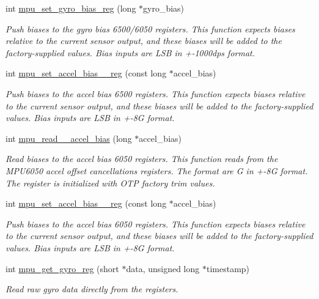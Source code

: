 \begin{DoxyCompactItemize}
int \hyperlink{group___d_r_i_v_e_r_s_ga01361a0f5c1f048cb0742bd3d0e4d3a5}{mpu\+\_\+set\+\_\+gyro\+\_\+bias\+\_\+reg} (long $\ast$gyro\+\_\+bias)
\begin{DoxyCompactList}\small\item\em Push biases to the gyro bias 6500/6050 registers. This function expects biases relative to the current sensor output, and these biases will be added to the factory-\/supplied values. Bias inputs are L\+SB in +-\/1000dps format. \end{DoxyCompactList}\item 
int \hyperlink{group___d_r_i_v_e_r_s_gaa7265afee29b8307ff49a8b1ccd9238a}{mpu\+\_\+set\+\_\+accel\+\_\+bias\+\_\+\_\+reg} (const long $\ast$accel\+\_\+bias)
\begin{DoxyCompactList}\small\item\em Push biases to the accel bias 6500 registers. This function expects biases relative to the current sensor output, and these biases will be added to the factory-\/supplied values. Bias inputs are L\+SB in +-\/8G format. \end{DoxyCompactList}\item 
int \hyperlink{group___d_r_i_v_e_r_s_gaed37421e1f140d10ee0eff0efeade27b}{mpu\+\_\+read\+\_\+\_\+accel\+\_\+bias} (long $\ast$accel\+\_\+bias)
\begin{DoxyCompactList}\small\item\em Read biases to the accel bias 6050 registers. This function reads from the M\+P\+U6050 accel offset cancellations registers. The format are G in +-\/8G format. The register is initialized with O\+TP factory trim values. \end{DoxyCompactList}\item 
int \hyperlink{group___d_r_i_v_e_r_s_gae2eb5073dacc7455101bf6818e35c40a}{mpu\+\_\+set\+\_\+accel\+\_\+bias\+\_\+\_\+reg} (const long $\ast$accel\+\_\+bias)
\begin{DoxyCompactList}\small\item\em Push biases to the accel bias 6050 registers. This function expects biases relative to the current sensor output, and these biases will be added to the factory-\/supplied values. Bias inputs are L\+SB in +-\/8G format. \end{DoxyCompactList}\item 
int \hyperlink{group___d_r_i_v_e_r_s_ga5555854590ad11495c0e30401294bae2}{mpu\+\_\+get\+\_\+gyro\+\_\+reg} (short $\ast$data, unsigned long $\ast$timestamp)
\begin{DoxyCompactList}\small\item\em Read raw gyro data directly from the registers. \end{DoxyCompactList}\item 

\end{DoxyCompactItemize}
